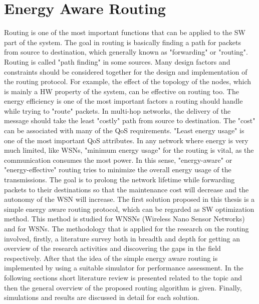 \documentclass[12pt, oneandhalf, chaparabic, sees, ms]{metu}
\begin{document}
\newpage
\chapter{Energy Aware Routing}\label{cwsnrouting}
\vspace{-1.7cm}

Routing is one of the most important functions that can be applied to the SW part of the system. The goal in routing is basically
finding a path for packets from source to destination, which generally known as "forwarding" or "routing". Routing is called
"path finding" in some sources.
Many design factors and constraints should be considered together for the design and implementation of the routing protocol.
For example, the effect of the topology of the nodes, which is mainly a HW property of the system, can be effective on routing too. 
The energy efficiency is one of the most important factors a routing should handle while trying to "route" packets.
In multi-hop networks, the delivery of 
the message should take the least "costly" path from source to destination. The "cost" can be associated with many of the QoS
requirements. "Least energy usage" is one of the most important QoS attributes. 
In any network where energy is very much limited, like WSNs, "minimum energy usage" for the routing is vital, as the communication consumes 
the most power.
In this sense, "energy-aware" or "energy-effective" routing tries to minimize the overall energy usage of the transmissions. 
The goal is to prolong the network lifetime while forwarding packets to their destinations so that the maintenance cost will decrease and the autonomy of the WSN will increase.
The first solution proposed in this thesis is a simple energy aware routing protocol, which can be 
regarded as SW optimization method. This method is studied for WNSNs (Wireless Nano Sensor Networks) and for WSNs.
The methodology that is applied for the research on the routing involved, firstly, a literature survey both in breadth and depth for getting an overview
of the research activities and discovering the gaps in the field respectively. After that the idea of the simple energy aware routing is implemented by using
a suitable simulator for performance assessment. 
In the following sections short literature review is presented related to the topic and then the general overview of the proposed
routing algorithm is given. Finally, simulations and results are discussed in detail for each solution.
\end{document}
